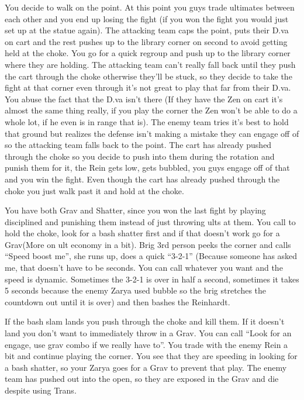 You decide to walk on the point. At this point you guys trade ultimates between each other and you end up losing the fight (if you won the fight you would just set up at the statue again). The attacking team caps the point, puts their D.va on cart and the rest pushes up to the library corner on second to avoid getting held at the choke. You go for a quick regroup and push up to the library corner where they are holding. The attacking team can’t really fall back until they push the cart through the choke otherwise they’ll be stuck, so they decide to take the fight at that corner even through it’s not great to play that far from their D.va. You abuse the fact that the D.va isn’t there (If they have the Zen on cart it’s almost the same thing really, if you play the corner the Zen won’t be able to do a whole lot, if he even is in range that is).
The enemy team tries it’s best to hold that ground but realizes the defense isn’t making a mistake they can engage off of so the attacking team falls back to the point. The cart has already pushed through the choke so you decide to push into them during the rotation and punish them for it, the Rein gets low, gets bubbled, you guys engage off of that and you win the fight. Even though the cart has already pushed through the choke you just walk past it and hold at the choke. 

You have both Grav and Shatter, since you won the last fight by playing disciplined and punishing them instead of just throwing ults at them. You call to hold the choke, look for a bash shatter first and if that doesn’t work go for a Grav(More on ult economy in a bit). Brig 3rd person peeks the corner and calls “Speed boost me”, she runs up, does a quick “3-2-1” (Because someone has asked me, that doesn’t have to be seconds. You can call whatever you want and the speed is dynamic. Sometimes the 3-2-1 is over in half a second, sometimes it takes 5 seconds because the enemy Zarya used bubble so the brig stretches the countdown out until it is over) and then bashes the Reinhardt.

If the bash slam lands you push through the choke and kill them. If it doesn’t land you don't want to immediately throw in a Grav. You can call “Look for an engage, use grav combo if we really have to”. You trade with the enemy Rein a bit and continue playing the corner. You see that they are speeding in looking for a bash shatter, so your Zarya goes for a Grav to prevent that play. The enemy team has pushed out into the open, so they are exposed in the Grav and die despite using Trans.

